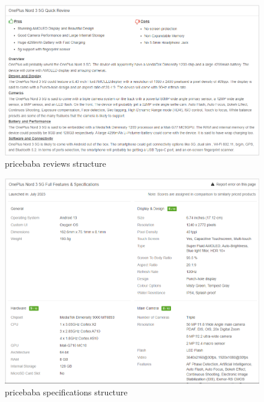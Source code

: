 \begin{figure}[H]
    \centering
    \includegraphics[width=12cm]{images/pricebaba_review_structure.png}
    \caption{pricebaba reviews structure \cite{OnePlusNord35G2023}}
    \label{fig:pricebaba-review-structure}
\end{figure}
\begin{figure}[H]
    \centering
    \includegraphics[width=12cm]{images/pricebaba_spec_structure.png}
    \caption{pricebaba specifications structure \cite{OnePlusNord35G2023}}
    \label{fig:pricebaba-spec-structure}
\end{figure}

